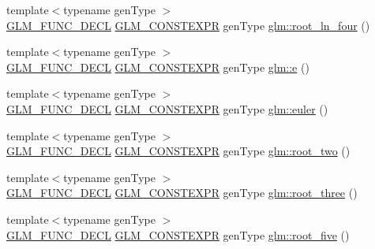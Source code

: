 \begin{DoxyCompactItemize}
\item 
{\footnotesize template$<$typename gen\+Type $>$ }\\\mbox{\hyperlink{setup_8hpp_ab2d052de21a70539923e9bcbf6e83a51}{G\+L\+M\+\_\+\+F\+U\+N\+C\+\_\+\+D\+E\+CL}} \mbox{\hyperlink{setup_8hpp_a08b807947b47031d3a511f03f89645ad}{G\+L\+M\+\_\+\+C\+O\+N\+S\+T\+E\+X\+PR}} gen\+Type \mbox{\hyperlink{group__gtc__constants_ga4129412e96b33707a77c1a07652e23e2}{glm\+::root\+\_\+ln\+\_\+four}} ()
\item 
{\footnotesize template$<$typename gen\+Type $>$ }\\\mbox{\hyperlink{setup_8hpp_ab2d052de21a70539923e9bcbf6e83a51}{G\+L\+M\+\_\+\+F\+U\+N\+C\+\_\+\+D\+E\+CL}} \mbox{\hyperlink{setup_8hpp_a08b807947b47031d3a511f03f89645ad}{G\+L\+M\+\_\+\+C\+O\+N\+S\+T\+E\+X\+PR}} gen\+Type \mbox{\hyperlink{group__gtc__constants_ga4b7956eb6e2fbedfc7cf2e46e85c5139}{glm\+::e}} ()
\item 
{\footnotesize template$<$typename gen\+Type $>$ }\\\mbox{\hyperlink{setup_8hpp_ab2d052de21a70539923e9bcbf6e83a51}{G\+L\+M\+\_\+\+F\+U\+N\+C\+\_\+\+D\+E\+CL}} \mbox{\hyperlink{setup_8hpp_a08b807947b47031d3a511f03f89645ad}{G\+L\+M\+\_\+\+C\+O\+N\+S\+T\+E\+X\+PR}} gen\+Type \mbox{\hyperlink{group__gtc__constants_gad8fe2e6f90bce9d829e9723b649fbd42}{glm\+::euler}} ()
\item 
{\footnotesize template$<$typename gen\+Type $>$ }\\\mbox{\hyperlink{setup_8hpp_ab2d052de21a70539923e9bcbf6e83a51}{G\+L\+M\+\_\+\+F\+U\+N\+C\+\_\+\+D\+E\+CL}} \mbox{\hyperlink{setup_8hpp_a08b807947b47031d3a511f03f89645ad}{G\+L\+M\+\_\+\+C\+O\+N\+S\+T\+E\+X\+PR}} gen\+Type \mbox{\hyperlink{group__gtc__constants_ga74e607d29020f100c0d0dc46ce2ca950}{glm\+::root\+\_\+two}} ()
\item 
{\footnotesize template$<$typename gen\+Type $>$ }\\\mbox{\hyperlink{setup_8hpp_ab2d052de21a70539923e9bcbf6e83a51}{G\+L\+M\+\_\+\+F\+U\+N\+C\+\_\+\+D\+E\+CL}} \mbox{\hyperlink{setup_8hpp_a08b807947b47031d3a511f03f89645ad}{G\+L\+M\+\_\+\+C\+O\+N\+S\+T\+E\+X\+PR}} gen\+Type \mbox{\hyperlink{group__gtc__constants_ga4f286be4abe88be1eed7d2a9f6cb193e}{glm\+::root\+\_\+three}} ()
\item 
{\footnotesize template$<$typename gen\+Type $>$ }\\\mbox{\hyperlink{setup_8hpp_ab2d052de21a70539923e9bcbf6e83a51}{G\+L\+M\+\_\+\+F\+U\+N\+C\+\_\+\+D\+E\+CL}} \mbox{\hyperlink{setup_8hpp_a08b807947b47031d3a511f03f89645ad}{G\+L\+M\+\_\+\+C\+O\+N\+S\+T\+E\+X\+PR}} gen\+Type \mbox{\hyperlink{group__gtc__constants_gae9ebbded75b53d4faeb1e4ef8b3347a2}{glm\+::root\+\_\+five}} ()

\end{DoxyCompactItemize}
